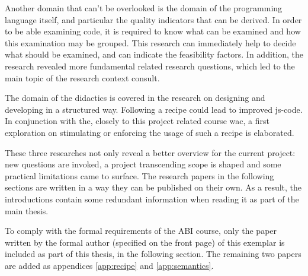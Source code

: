 Another domain that can't be overlooked is the domain of the programming
language itself, and particular the quality indicators that can be derived. In
order to be able examining code, it is required to know what can be examined and
how this examination may be grouped. This research can immediately help to 
decide what should be examined, and can indicate the feasibility factors. In
addition, the research revealed more fundamental related research questions, which
led to the main topic of the research context consult.

The domain of the didactics is covered in the research on designing and developing
in a structured way. Following a recipe could lead to improved \gls{js-code}. In
conjunction with the, closely to this project related course \gls{wac}, a first
exploration on stimulating or enforcing the usage of such a recipe is elaborated.

These three researches not only reveal a better overview for the current project:
new questions are invoked, a project transcending scope is shaped and some practical
limitations came to surface. The research papers in the following sections are
written in a way they can be published on their own. As a result, the introductions
contain some redundant information when reading it as part of the main thesis.

To comply with the formal requirements of the ABI course, only the paper written
by the formal author (specified on the front page) of this exemplar is included 
as part of this thesis, in the following section. The remaining two papers are 
added as appendices \ref{app:recipe} and \ref{app:semantics}.
